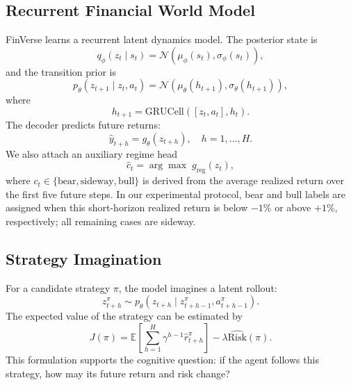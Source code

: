\documentclass[letterpaper]{article}
\begin{document}
\subsection{Recurrent Financial World Model}
FinVerse learns a recurrent latent dynamics model. The posterior state is
\begin{equation}
    q_\phi(z_t \mid s_t) = \mathcal{N}(\mu_\phi(s_t), \sigma_\phi(s_t)),
\end{equation}
and the transition prior is
\begin{equation}
    p_\theta(z_{t+1} \mid z_t, a_t) =
    \mathcal{N}(\mu_\theta(h_{t+1}), \sigma_\theta(h_{t+1})),
\end{equation}
where
\begin{equation}
    h_{t+1} = \mathrm{GRUCell}([z_t, a_t], h_t).
\end{equation}
The decoder predicts future returns:
\begin{equation}
    \hat{y}_{t+h} = g_\theta(z_{t+h}), \quad h=1,\ldots,H.
\end{equation}
We also attach an auxiliary regime head
\begin{equation}
    \hat{c}_t = \arg\max \; g_{\mathrm{reg}}(z_t),
\end{equation}
where $c_t \in \{\mathrm{bear}, \mathrm{sideway}, \mathrm{bull}\}$ is derived from the average realized return over the first five future steps. In our experimental protocol, bear and bull labels are assigned when this short-horizon realized return is below $-1\%$ or above $+1\%$, respectively; all remaining cases are sideway.

\subsection{Strategy Imagination}
For a candidate strategy $\pi$, the model imagines a latent rollout:
\begin{equation}
    z_{t+h}^{\pi} \sim p_\theta(z_{t+h} \mid z_{t+h-1}^{\pi}, a_{t+h-1}^{\pi}).
\end{equation}
The expected value of the strategy can be estimated by
\begin{equation}
    J(\pi) = \mathbb{E}\left[\sum_{h=1}^{H}\gamma^{h-1}\hat{r}_{t+h}^{\pi}\right]
    - \lambda \widehat{\mathrm{Risk}}(\pi).
\end{equation}
This formulation supports the cognitive question: if the agent follows this strategy, how may its future return and risk change?
\end{document}
